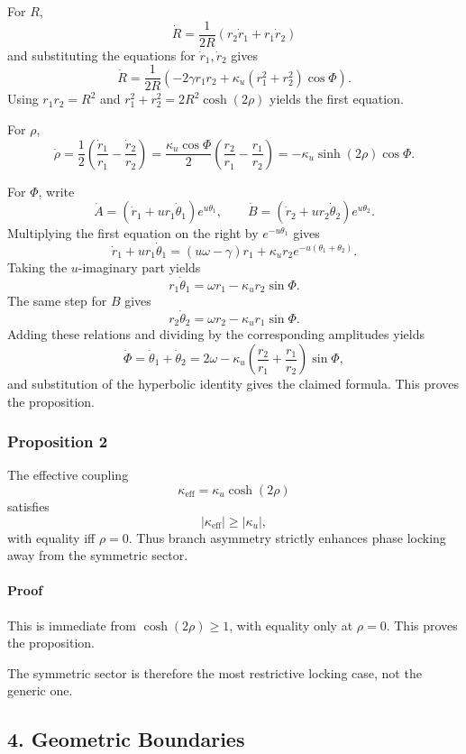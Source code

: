 \documentclass[
]{article}
\begin{document}
For \(R\), \[
\dot{R} = \frac{1}{2R}(r_2\dot{r}_1 + r_1\dot{r}_2)
\] and substituting the equations for \(\dot{r}_1,\dot{r}_2\) gives \[
\dot{R}
= \frac{1}{2R}\left(-2\gamma r_1r_2 + \kappa_{u}(r_1^2+r_2^2)\cos\Phi\right).
\] Using \(r_1r_2 = R^2\) and \(r_1^2+r_2^2 = 2R^2\cosh(2\rho)\) yields
the first equation.

For \(\rho\), \[
\dot{\rho}
= \frac{1}{2}\left(\frac{\dot{r}_1}{r_1} - \frac{\dot{r}_2}{r_2}\right)
= \frac{\kappa_{u}\cos\Phi}{2}\left(\frac{r_2}{r_1} - \frac{r_1}{r_2}\right)
= -\kappa_{u} \sinh(2\rho)\cos\Phi.
\]

For \(\Phi\), write \[
\dot{A} = (\dot{r}_1 + u r_1\dot{\theta}_1)e^{u\theta_1},
\qquad
\dot{B} = (\dot{r}_2 + u r_2\dot{\theta}_2)e^{u\theta_2}.
\] Multiplying the first equation on the right by \(e^{-u\theta_1}\)
gives \[
\dot{r}_1 + u r_1\dot{\theta}_1
= (u\omega-\gamma)r_1 + \kappa_{u}r_2 e^{-u(\theta_1+\theta_2)}.
\] Taking the \(u\)-imaginary part yields \[
r_1\dot{\theta}_1 = \omega r_1 - \kappa_{u} r_2 \sin\Phi.
\] The same step for \(B\) gives \[
r_2\dot{\theta}_2 = \omega r_2 - \kappa_{u} r_1 \sin\Phi.
\] Adding these relations and dividing by the corresponding amplitudes
yields \[
\dot{\Phi} = \dot{\theta}_1 + \dot{\theta}_2
= 2\omega - \kappa_{u}\left(\frac{r_2}{r_1} + \frac{r_1}{r_2}\right)\sin\Phi,
\] and substitution of the hyperbolic identity gives the claimed
formula. This proves the proposition.

\subsubsection{Proposition 2}\label{proposition-2}

The effective coupling \[
\kappa_{\mathrm{eff}} = \kappa_{u} \cosh(2\rho)
\] satisfies \[
|\kappa_{\mathrm{eff}}| \ge |\kappa_{u}|,
\] with equality iff \(\rho = 0\). Thus branch asymmetry strictly
enhances phase locking away from the symmetric sector.

\paragraph{Proof}\label{proof-1}

This is immediate from \(\cosh(2\rho) \ge 1\), with equality only at
\(\rho=0\). This proves the proposition.

The symmetric sector is therefore the most restrictive locking case, not
the generic one.

\subsection{4. Geometric Boundaries}\label{geometric-boundaries}
\end{document}
